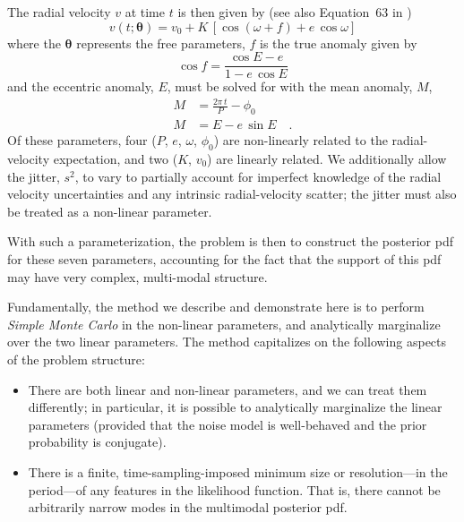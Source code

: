 \documentclass[manuscript, letterpaper]{aastex6}
\newcommand{\eqname}{Equation}
\newcommand{\bs}[1]{\boldsymbol{#1}}
\begin{document}
The radial velocity $v$ at time $t$ is then given by (see also \eqname~63 in
\citealt{Murray:2010})
\begin{equation}
  v(t;\bs{\theta}) = v_0 + K\,[\cos(\omega + f) + e\,\cos\omega]
\end{equation}
where the $\bs{\theta}$ represents the free parameters, $f$ is the true anomaly
given by
\begin{equation}
  \cos f = \frac{\cos E - e}{1 - e\, \cos E}
\end{equation}
and the eccentric anomaly, $E$, must be solved for with the mean
anomaly, $M$,
\begin{align}
  M &= \frac{2\pi\, t}{P} - \phi_0\\
  M &= E - e\,\sin E \quad .
\end{align}
Of these parameters, four ($P$, $e$, $\omega$, $\phi_0$) are non-linearly
related to the radial-velocity expectation, and two ($K$, $v_0$) are
linearly related.
We additionally allow the jitter, $s^2$, to vary to partially account for
imperfect knowledge of the radial velocity uncertainties and any intrinsic
radial-velocity scatter; the jitter must also be treated as a non-linear
parameter.

With such a parameterization, the problem is then to construct the posterior pdf
for these seven parameters, accounting for the fact that the support of this pdf
may have very complex, multi-modal structure.

Fundamentally, the method we describe and demonstrate here is to perform
\emph{Simple Monte Carlo} in the non-linear parameters, and analytically
marginalize over the two linear parameters.
The method capitalizes on the following aspects of the problem structure:
\begin{itemize}\itemsep0ex
\item There are both linear and non-linear parameters, and we can
  treat them differently; in particular, it is possible to
  analytically marginalize the linear parameters (provided that the
  noise model is well-behaved and the prior probability is conjugate).
\item There is a finite, time-sampling-imposed minimum size or
  resolution---in the period---of any features in the
  likelihood function. That is, there cannot be arbitrarily narrow
  modes in the multimodal posterior pdf.
\end{itemize}
\end{document}
